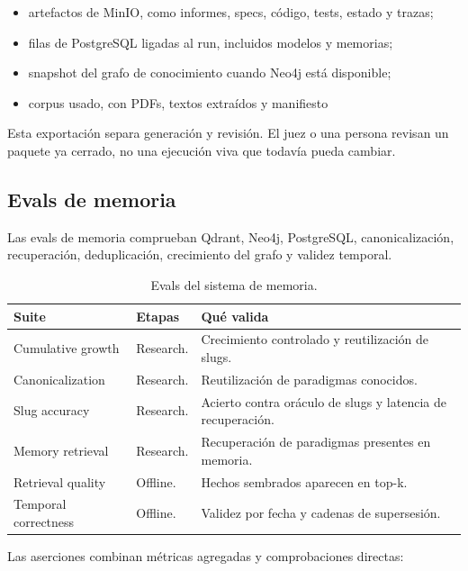 \begin{itemize}
\item artefactos de MinIO, como informes, specs, código, tests, estado y trazas;
\item filas de PostgreSQL ligadas al run, incluidos modelos y memorias;
\item snapshot del grafo de conocimiento cuando Neo4j está disponible;
\item corpus usado, con PDFs, textos extraídos y manifiesto
\end{itemize}

Esta exportación separa generación y revisión. El juez o una persona revisan
un paquete ya cerrado, no una ejecución viva que todavía pueda cambiar.

\subsection{Evals de memoria}

Las evals de memoria comprueban Qdrant, Neo4j, PostgreSQL, canonicalización,
recuperación, deduplicación, crecimiento del grafo y validez temporal.

\begin{table}[H]
\begin{center}
\small
\begin{tabular}{|p{3.2cm}|p{2.5cm}|p{6.6cm}|} \hline
\textbf{Suite} & \textbf{Etapas} & \textbf{Qué valida} \\ \hline
Cumulative growth & Research. & Crecimiento controlado y reutilización de slugs. \\ \hline
Canonicalization & Research. & Reutilización de paradigmas conocidos. \\ \hline
Slug accuracy & Research. & Acierto contra oráculo de slugs y latencia de recuperación. \\ \hline
Memory retrieval & Research. & Recuperación de paradigmas presentes en memoria. \\ \hline
Retrieval quality & Offline. & Hechos sembrados aparecen en top-k. \\ \hline
Temporal correctness & Offline. & Validez por fecha y cadenas de supersesión. \\ \hline
\end{tabular}
\caption{Evals del sistema de memoria.}
\end{center}
\end{table}

Las aserciones combinan métricas agregadas y comprobaciones directas:

